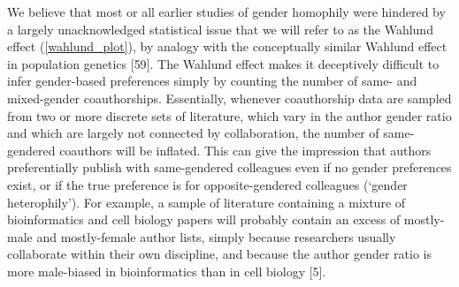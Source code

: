 \documentclass[12pt,]{article}
\begin{document}
We believe that most or all earlier studies of gender homophily were
hindered by a largely unacknowledged statistical issue that we will
refer to as the Wahlund effect (\autoref{wahlund_plot}), by analogy with
the conceptually similar Wahlund effect in population genetics {[}59{]}.
The Wahlund effect makes it deceptively difficult to infer gender-based
preferences simply by counting the number of same- and mixed-gender
coauthorships. Essentially, whenever coauthorship data are sampled from
two or more discrete sets of literature, which vary in the author gender
ratio and which are largely not connected by collaboration, the number
of same-gendered coauthors will be inflated. This can give the
impression that authors preferentially publish with same-gendered
colleagues even if no gender preferences exist, or if the true
preference is for opposite-gendered colleagues (`gender heterophily').
For example, a sample of literature containing a mixture of
bioinformatics and cell biology papers will probably contain an excess
of mostly-male and mostly-female author lists, simply because
researchers usually collaborate within their own discipline, and because
the author gender ratio is more male-biased in bioinformatics than in
cell biology {[}5{]}.
\end{document}
